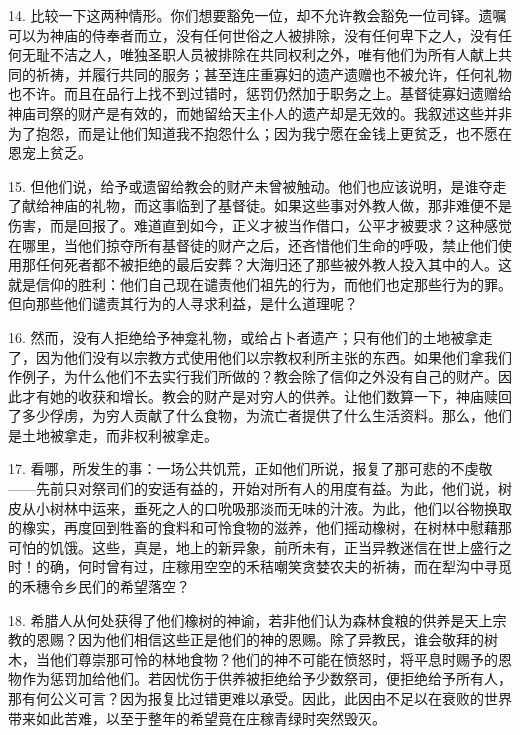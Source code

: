 14. 比较一下这两种情形。你们想要豁免一位，却不允许教会豁免一位司铎。遗嘱可以为神庙的侍奉者而立，没有任何世俗之人被排除，没有任何卑下之人，没有任何无耻不洁之人，唯独圣职人员被排除在共同权利之外，唯有他们为所有人献上共同的祈祷，并履行共同的服务；甚至连庄重寡妇的遗产遗赠也不被允许，任何礼物也不许。而且在品行上找不到过错时，惩罚仍然加于职务之上。基督徒寡妇遗赠给神庙司祭的财产是有效的，而她留给天主仆人的遗产却是无效的。我叙述这些并非为了抱怨，而是让他们知道我不抱怨什么；因为我宁愿在金钱上更贫乏，也不愿在恩宠上贫乏。\par

15. 但他们说，给予或遗留给教会的财产未曾被触动。他们也应该说明，是谁夺走了献给神庙的礼物，而这事临到了基督徒。如果这些事对外教人做，那非难便不是伤害，而是回报了。难道直到如今，正义才被当作借口，公平才被要求？这种感觉在哪里，当他们掠夺所有基督徒的财产之后，还吝惜他们生命的呼吸，禁止他们使用那任何死者都不被拒绝的最后安葬？大海归还了那些被外教人投入其中的人。这就是信仰的胜利：他们自己现在谴责他们祖先的行为，而他们也定那些行为的罪。但向那些他们谴责其行为的人寻求利益，是什么道理呢？\par

16. 然而，没有人拒绝给予神龛礼物，或给占卜者遗产；只有他们的土地被拿走了，因为他们没有以宗教方式使用他们以宗教权利所主张的东西。如果他们拿我们作例子，为什么他们不去实行我们所做的？教会除了信仰之外没有自己的财产。因此才有她的收获和增长。教会的财产是对穷人的供养。让他们数算一下，神庙赎回了多少俘虏，为穷人贡献了什么食物，为流亡者提供了什么生活资料。那么，他们是土地被拿走，而非权利被拿走。\par

17. 看哪，所发生的事：一场公共饥荒，正如他们所说，报复了那可悲的不虔敬——先前只对祭司们的安适有益的，开始对所有人的用度有益。为此，他们说，树皮从小树林中运来，垂死之人的口吮吸那淡而无味的汁液。为此，他们以谷物换取的橡实，再度回到牲畜的食料和可怜食物的滋养，他们摇动橡树，在树林中慰藉那可怕的饥饿。这些，真是，地上的新异象，前所未有，正当异教迷信在世上盛行之时！的确，何时曾有过，庄稼用空空的禾秸嘲笑贪婪农夫的祈祷，而在犁沟中寻觅的禾穗令乡民们的希望落空？\par

18. 希腊人从何处获得了他们橡树的神谕，若非他们认为森林食粮的供养是天上宗教的恩赐？因为他们相信这些正是他们的神的恩赐。除了异教民，谁会敬拜的树木，当他们尊崇那可怜的林地食物？他们的神不可能在愤怒时，将平息时赐予的恩物作为惩罚加给他们。若因忧伤于供养被拒绝给予少数祭司，便拒绝给予所有人，那有何公义可言？因为报复比过错更难以承受。因此，此因由不足以在衰败的世界带来如此苦难，以至于整年的希望竟在庄稼青绿时突然毁灭。\par

